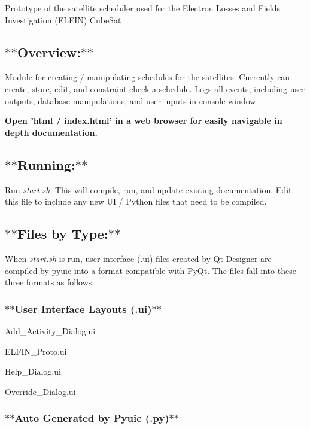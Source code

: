 Prototype of the satellite scheduler used for the Electron Losses and Fields Investigation (E\-L\-F\-I\-N) Cube\-Sat

\subsection*{$\ast$$\ast$\-Overview\-:$\ast$$\ast$}

Module for creating / manipulating schedules for the satellites. Currently can create, store, edit, and constraint check a schedule. Logs all events, including user outputs, database manipulations, and user inputs in console window.

{\bfseries Open 'html / index.\-html' in a web browser for easily navigable in depth documentation.}



\subsection*{$\ast$$\ast$\-Running\-:$\ast$$\ast$}

Run {\itshape start.\-sh}. This will compile, run, and update existing documentation. Edit this file to include any new U\-I / Python files that need to be compiled.

\subsection*{$\ast$$\ast$\-Files by Type\-:$\ast$$\ast$}

When {\itshape start.\-sh} is run, user interface (.ui) files created by Qt Designer are compiled by pyuic into a format compatible with Py\-Qt. The files fall into these three formats as follows\-:

\subsubsection*{$\ast$$\ast$\-User Interface Layouts (.ui)$\ast$$\ast$}


\begin{DoxyItemize}
\item Add\-\_\-\-Activity\-\_\-\-Dialog.\-ui
\item E\-L\-F\-I\-N\-\_\-\-Proto.\-ui
\item Help\-\_\-\-Dialog.\-ui
\item Override\-\_\-\-Dialog.\-ui
\end{DoxyItemize}

\subsubsection*{$\ast$$\ast$\-Auto Generated by Pyuic (.py)$\ast$$\ast$}


